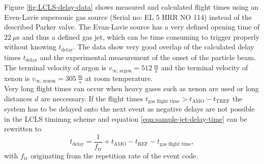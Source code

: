 Figure \ref{fig:LCLS-delay-data} shows measured and calculated flight times using an Even-Lavie supersonic gas source (Serial no: EL 5 HRR NO 114) instead of the described Parker valve. The Evan-Lavie source has a very defined opening time of $22~\mu$s and thus a defined gas jet, which can be time consuming to trigger properly without knowing $t_{\text{delay}}$. The data show very good overlap of the calculated delay times $t_{\text{delay}}$ and the experimental measurement of the onset of the particle beam. The terminal velocity of argon is $v_{\infty,\text{argon}}=512~\frac{\text{m}}{\text{s}}$ and the terminal velocity of xenon is $v_{\infty,\text{xenon}}=305~\frac{\text{m}}{\text{s}}$ at room temperature.\\
Very long flight times can occur when heavy gases such as xenon are used or long distances $d$ are neccessary. If the flight times $t_{\text{gas flight time}} > t_{\text{AMO}} - t_{\text{TREF}}$ the system has to be delayed onto the next event as negative delays are not possible in the LCLS timimng scheme and equation \eqref{eqn:sample-jet-delay-time} can be rewritten to
\begin{equation}
t_{\text{delay}} = \frac{1}{f_{\text{rr}}}+ t_{\text{AMO}} - t_{\text{REF}} - t_{\text{gas flight time}},
\label{eqn:sample-jet-delay-time-next}
\end{equation}
with $f_{\text{rr}}$ originating from the repetition rate of the event code.
%
%
%
